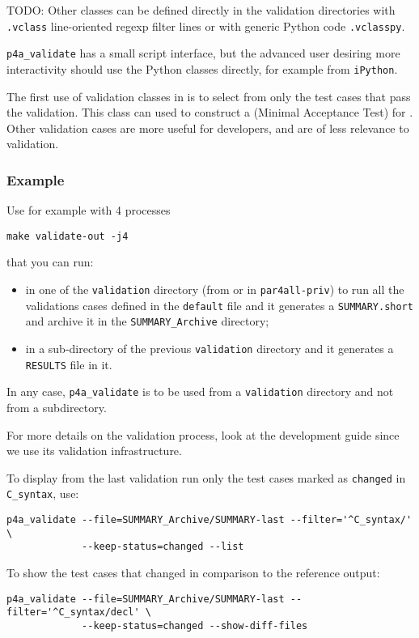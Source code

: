 \documentclass[a4paper]{article}
\begin{document}
TODO: Other classes can be defined directly in the validation
directories with \texttt{.vclass} line-oriented regexp filter lines or with
generic Python code \texttt{.vclasspy}.

\verb|p4a_validate| has a small script interface, but the advanced
user desiring more interactivity
should use the Python classes directly, for example from \texttt{iPython}.

The first use of validation classes in \Apfa is to select from \Apips
only the test cases that pass the \Apips validation. This class can used to
construct a
\Amat (Minimal Acceptance Test) for \Apfa. Other \Apips validation
cases are more useful for \Apips developers, and are of less relevance
to \Apfa validation.

\subsubsection{Example}
\label{sec:example}

Use for example with 4 processes
\begin{verbatim}
make validate-out -j4
\end{verbatim}
that you can run:
\begin{itemize}
\item in one of the \texttt{validation} directory (from \Apips or in
  \texttt{par4all-priv}) to run all the validations cases defined in the
  \texttt{default} file and it generates a \texttt{SUMMARY.short} and
  archive it in the \verb|SUMMARY_Archive| directory;
\item in a sub-directory of the previous \texttt{validation} directory and
  it generates a \texttt{RESULTS} file in it.
\end{itemize}
In any case, \verb|p4a_validate| is to be used from a \texttt{validation}
directory and not from a subdirectory.

For more details on the validation process, look at the \Apips development
guide since we use its validation infrastructure.

To display from the last validation run only the test cases marked as
\texttt{changed} in \verb|C_syntax|, use:
\begin{verbatim}
p4a_validate --file=SUMMARY_Archive/SUMMARY-last --filter='^C_syntax/' \
             --keep-status=changed --list
\end{verbatim}

To show the test cases that changed in comparison to the reference output:
\begin{verbatim}
p4a_validate --file=SUMMARY_Archive/SUMMARY-last --filter='^C_syntax/decl' \
             --keep-status=changed --show-diff-files
\end{verbatim}
\end{document}
